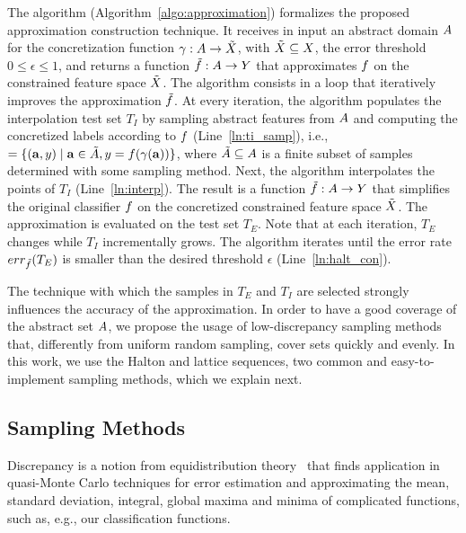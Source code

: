 The  algorithm (Algorithm~\ref{algo:approximation}) formalizes the proposed approximation
construction technique. 
It receives in input an abstract domain $A$ for the concretization
function $\gamma : A \to \tilde{X}$, with $\tilde{X} \subseteq X$, the error
threshold $0 \leq \epsilon \leq 1$, and returns a function
$\tilde{f} : A \to Y$ that  approximates $f$
on the constrained feature space $\tilde{X}$. The algorithm consists in a loop that
iteratively improves the approximation $\tilde{f}$.
At every iteration, the algorithm populates the interpolation test set $T_I$
by sampling abstract features from $A$ and computing the concretized 
labels according to $f$ (Line~\ref{ln:ti_samp}), i.e.,
$ = \{ (\mathbf{a},y) \mid \mathbf{a} \in \tilde{A}, y = f(\gamma(\mathbf{a}))\}$,
where $\tilde{A} \subseteq A$ is a finite subset of samples determined with some 
sampling method.
Next, the algorithm interpolates the points of $T_I$ (Line~\ref{ln:interp}).
The result is a function $\tilde{f} : A \to Y$ that simplifies the
original classifier $f$ on the concretized constrained feature space $\tilde{X}$.
The approximation is evaluated on the test set $T_E$.
Note that at each iteration, $T_E$ changes while $T_I$
incrementally grows. The algorithm iterates until the error rate $err_{\tilde{f}}(T_E)$
is smaller than the desired threshold $\epsilon$ (Line~\ref{ln:halt_con}).

The technique with which the samples in $T_E$ and $T_I$ are 
selected strongly influences the accuracy of the approximation.
In order to have a good coverage of the abstract set $A$,
we propose the usage of low-discrepancy sampling methods that,
differently from uniform random sampling, cover sets quickly and evenly.
In this work, we use the Halton and lattice sequences, 
two common and easy-to-implement sampling methods, which we
explain next.


\subsection{Sampling Methods}
\label{sec:sample_methods}

Discrepancy is a notion from equidistribution theory~\cite{weyl1916gleichverteilung,rosenblatt1995pointwise} that finds application in 
quasi-Monte Carlo techniques for error estimation and approximating
the mean, standard deviation, integral,
global maxima and minima of complicated functions, 
such as, e.g., our classification functions.

